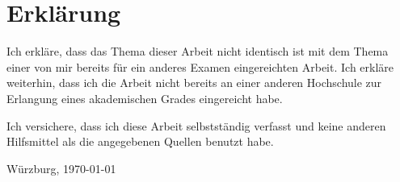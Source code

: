\documentclass[12pt,a4paper,twoside]{book}
\begin{document}
\maketitle
\tableofcontents












\appendix








\pagestyle{plain}


\iflatexml
\else


\chapter*{Erklärung}
Ich erkläre, dass das Thema dieser Arbeit nicht identisch ist mit dem Thema
einer von mir bereits für ein anderes Examen eingereichten Arbeit. Ich erkläre
weiterhin, dass ich die Arbeit nicht bereits an einer anderen Hochschule zur
Erlangung eines akademischen Grades eingereicht habe.

Ich versichere, dass ich diese Arbeit selbstständig verfasst und keine
anderen Hilfsmittel als die angegebenen Quellen benutzt habe.

\vspace{3cm}
\setlength{\parindent}{0pt}
Würzburg, \today
\fi
\end{document}

